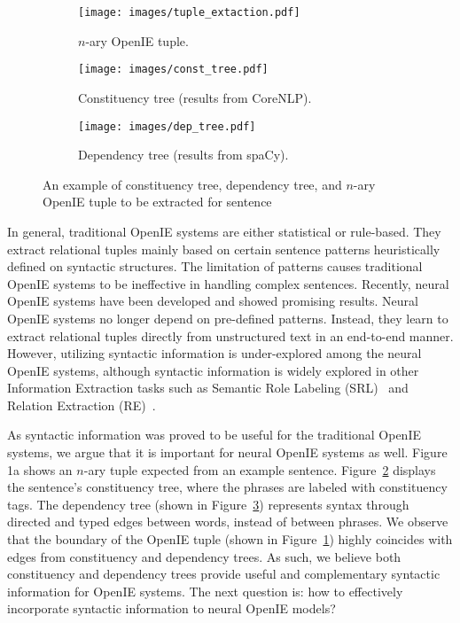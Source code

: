 \documentclass[11pt]{article}
\begin{document}
\begin{figure}[t]
\centering
\begin{subfigure}[b]{1\linewidth}
   \centering
   \texttt{[image: images/tuple\_extaction.pdf]}
   \caption{$n$-ary OpenIE tuple.}
   \label{fig:tuple_extraction}
\end{subfigure}
\begin{subfigure}[b]{1\linewidth}
   \centering
   \texttt{[image: images/const\_tree.pdf]}
   \caption{Constituency tree (results from CoreNLP).}
   \label{fig:const_tree}
\end{subfigure}
\begin{subfigure}[b]{1\linewidth}
   \centering
   \texttt{[image: images/dep\_tree.pdf]}
   \caption{Dependency tree (results from spaCy).}
   \label{fig:dep_tree}
\end{subfigure}
\vspace{-1.5em}
\caption{An example of constituency tree, dependency tree, and $n$-ary OpenIE tuple to be extracted for sentence }
\label{fig:syc_sentence}
\end{figure}


In general, traditional OpenIE systems are either statistical or rule-based. They extract relational tuples mainly based on certain sentence patterns heuristically defined on syntactic structures. 
The limitation of patterns causes traditional OpenIE systems to be ineffective in handling complex sentences.
Recently, neural OpenIE systems have been developed and showed promising results. Neural OpenIE systems no longer depend on pre-defined patterns.
Instead, they learn to extract relational tuples directly from unstructured text in an end-to-end manner.
However, utilizing syntactic information is under-explored among the neural OpenIE systems, although syntactic information is widely explored in other Information Extraction tasks such as Semantic Role Labeling (SRL)~\cite{fei-etal-2021-better} and Relation Extraction (RE)~\cite{zhang-etal-2018-graph}.

 
As syntactic information was proved to be useful for the traditional OpenIE systems, we argue that it is important for neural OpenIE systems as well. 
Figure 1a shows an $n$-ary tuple expected from an example sentence. 
Figure~\ref{fig:const_tree} displays the sentence's constituency tree, where the phrases are labeled with constituency tags.
The dependency tree (shown in Figure~\ref{fig:dep_tree}) represents syntax through directed and typed edges between words, instead of between phrases.
We observe that the boundary of the OpenIE tuple (shown in Figure~\ref{fig:tuple_extraction}) highly coincides with edges from constituency and dependency trees.
As such, we believe both constituency and dependency trees provide useful and complementary syntactic information for OpenIE systems.
The next question is: how to effectively incorporate syntactic information to neural OpenIE models? 
\end{document}
